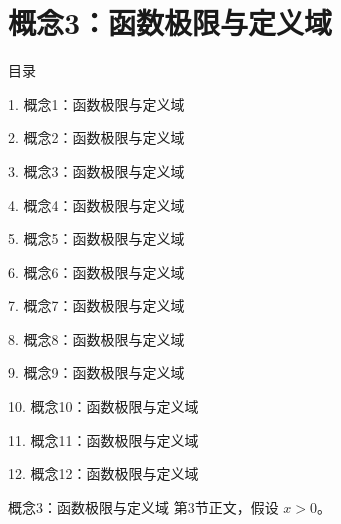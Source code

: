 \documentclass[aspectratio=169,10pt,fontset=fandol]{ctexbeamer}
\begin{document}
\section{概念3：函数极限与定义域}
\begin{frame}[t,fragile]{目录}
\small
{\color{black}\small 1. 概念1：函数极限与定义域\par}\vspace{0.22em}
{\color{black}\small 2. 概念2：函数极限与定义域\par}\vspace{0.22em}
{\color{blue}\small 3. 概念3：函数极限与定义域\par}\vspace{0.22em}
{\color{gray!40}\small 4. 概念4：函数极限与定义域\par}\vspace{0.22em}
{\color{gray!40}\small 5. 概念5：函数极限与定义域\par}\vspace{0.22em}
{\color{gray!40}\small 6. 概念6：函数极限与定义域\par}\vspace{0.22em}
{\color{gray!40}\small 7. 概念7：函数极限与定义域\par}\vspace{0.22em}
{\color{gray!40}\small 8. 概念8：函数极限与定义域\par}\vspace{0.22em}
{\color{gray!40}\small 9. 概念9：函数极限与定义域\par}\vspace{0.22em}
{\color{gray!40}\small 10. 概念10：函数极限与定义域\par}\vspace{0.22em}
{\color{gray!40}\small 11. 概念11：函数极限与定义域\par}\vspace{0.22em}
{\color{gray!40}\small 12. 概念12：函数极限与定义域\par}\vspace{0.22em}
\end{frame}
\begin{frame}[t,fragile]{概念3：函数极限与定义域}
\normalsize
{\normalsize
第3节正文，假设 $x>0$。
}
\end{frame}
\end{document}
